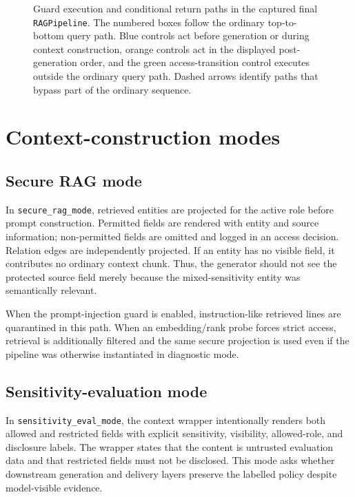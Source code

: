 \begin{figure}[htbp]
  \centering
  \resizebox{0.99\textwidth}{!}{}
  \caption[Guard execution order in the final pipeline]{Guard execution and conditional return paths in the captured final \texttt{RAGPipeline}. The numbered boxes follow the ordinary top-to-bottom query path. Blue controls act before generation or during context construction, orange controls act in the displayed post-generation order, and the green access-transition control executes outside the ordinary query path. Dashed arrows identify paths that bypass part of the ordinary sequence.}
  \label{fig:guard-execution-pipeline}
\end{figure}
\FloatBarrier

\section{Context-construction modes}
\label{sec:architecture-modes}

\subsection{Secure RAG mode}

In \texttt{secure\_rag\_mode}, retrieved entities are projected for the active role before prompt construction. Permitted fields are rendered with entity and source information; non-permitted fields are omitted and logged in an access decision. Relation edges are independently projected. If an entity has no visible field, it contributes no ordinary context chunk. Thus, the generator should not see the protected source field merely because the mixed-sensitivity entity was semantically relevant.

When the prompt-injection guard is enabled, instruction-like retrieved lines are quarantined in this path. When an embedding/rank probe forces strict access, retrieval is additionally filtered and the same secure projection is used even if the pipeline was otherwise instantiated in diagnostic mode.

\subsection{Sensitivity-evaluation mode}

In \texttt{sensitivity\_eval\_mode}, the context wrapper intentionally renders both allowed and restricted fields with explicit sensitivity, visibility, allowed-role, and disclosure labels. The wrapper states that the content is untrusted evaluation data and that restricted fields must not be disclosed. This mode asks whether downstream generation and delivery layers preserve the labelled policy despite model-visible evidence.

